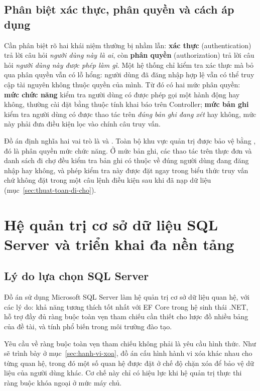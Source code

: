 \subsection{Phân biệt xác thực, phân quyền và cách áp dụng}

Cần phân biệt rõ hai khái niệm thường bị nhầm lẫn: \textbf{xác thực}
(authentication) trả lời câu hỏi \textit{người dùng này là ai}, còn \textbf{phân
quyền} (authorization) trả lời câu hỏi \textit{người dùng này được phép làm gì}.
Một hệ thống chỉ kiểm tra xác thực mà bỏ qua phân quyền vẫn có lỗ hổng: người
dùng đã đăng nhập hợp lệ vẫn có thể truy cập tài nguyên không thuộc quyền của
mình. Từ đó có hai mức phân quyền: \textbf{mức chức năng} kiểm tra người dùng có
được phép gọi một hành động hay không, thường cài đặt bằng thuộc tính khai báo
trên Controller; \textbf{mức bản ghi} kiểm tra người dùng có được thao tác trên
\textit{đúng bản ghi đang xét} hay không, mức này phải đưa điều kiện lọc vào
chính câu truy vấn.

Đồ án định nghĩa hai vai trò là  và . Toàn bộ khu vực
quản trị được bảo vệ bằng \code{[Authorize(Roles = "Admin")]}, đó là phân quyền
mức chức năng. Ở mức bản ghi, các thao tác trên thực đơn và danh sách đi chợ đều
kiểm tra bản ghi có thuộc về đúng người dùng đang đăng nhập hay không, và phép
kiểm tra này được đặt ngay trong biểu thức truy vấn chứ không đặt trong một câu
lệnh điều kiện sau khi đã nạp dữ liệu (mục~\ref{sec:thuat-toan-di-cho}).

\section{Hệ quản trị cơ sở dữ liệu SQL Server và triển khai đa nền tảng}
\label{sec:sqlserver}

\subsection{Lý do lựa chọn SQL Server}

Đồ án sử dụng Microsoft SQL Server làm hệ quản trị cơ sở dữ liệu quan hệ, với các
lý do: khả năng tương thích tốt nhất với EF Core trong hệ sinh thái .NET, hỗ trợ
đầy đủ ràng buộc toàn vẹn tham chiếu cần thiết cho lược đồ nhiều bảng của đề tài,
và tính phổ biến trong môi trường đào tạo.

Yêu cầu về ràng buộc toàn vẹn tham chiếu không phải là yêu cầu hình thức. Như sẽ
trình bày ở mục~\ref{sec:hanh-vi-xoa}, đồ án cấu hình hành vi xóa khác nhau cho
từng quan hệ, trong đó một số quan hệ được đặt ở chế độ chặn xóa để bảo vệ dữ
liệu của người dùng khác. Cơ chế này chỉ có hiệu lực khi hệ quản trị thực thi
ràng buộc khóa ngoại ở mức máy chủ.

